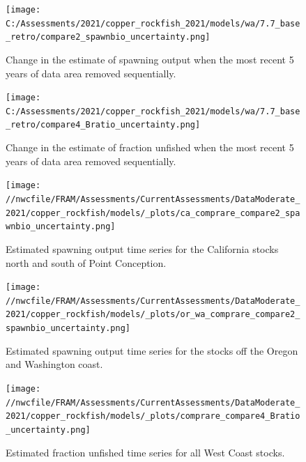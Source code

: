 \documentclass[11pt,
  english,
  a4paper,
]{article}
\begin{document}
\begin{figure}
\centering
\texttt{[image: C:/Assessments/2021/copper\_rockfish\_2021/models/wa/7.7\_base\_retro/compare2\_spawnbio\_uncertainty.png]}
\caption{Change in the estimate of spawning output when the most recent 5 years of data area removed sequentially.\label{fig:retro-ssb}}
\end{figure}

\tagmcend\tagstructend


\begin{figure}
\centering
\texttt{[image: C:/Assessments/2021/copper\_rockfish\_2021/models/wa/7.7\_base\_retro/compare4\_Bratio\_uncertainty.png]}
\caption{Change in the estimate of fraction unfished when the most recent 5 years of data area removed sequentially.\label{fig:retro-depl}}
\end{figure}

\tagmcend\tagstructend

\newpage


\begin{figure}
\centering
\texttt{[image: //nwcfile/FRAM/Assessments/CurrentAssessments/DataModerate\_2021/copper\_rockfish/models/\_plots/ca\_comprare\_compare2\_spawnbio\_uncertainty.png]}
\caption{Estimated spawning output time series for the California stocks north and south of Point Conception.\label{fig:ssb-ca-compare}}
\end{figure}

\tagmcend\tagstructend


\begin{figure}
\centering
\texttt{[image: //nwcfile/FRAM/Assessments/CurrentAssessments/DataModerate\_2021/copper\_rockfish/models/\_plots/or\_wa\_comprare\_compare2\_spawnbio\_uncertainty.png]}
\caption{Estimated spawning output time series for the stocks off the Oregon and Washington coast.\label{fig:ssb-orwa-compare}}
\end{figure}

\tagmcend\tagstructend


\begin{figure}
\centering
\texttt{[image: //nwcfile/FRAM/Assessments/CurrentAssessments/DataModerate\_2021/copper\_rockfish/models/\_plots/comprare\_compare4\_Bratio\_uncertainty.png]}
\caption{Estimated fraction unfished time series for all West Coast stocks.\label{fig:depl-compare}}
\end{figure}
\end{document}

